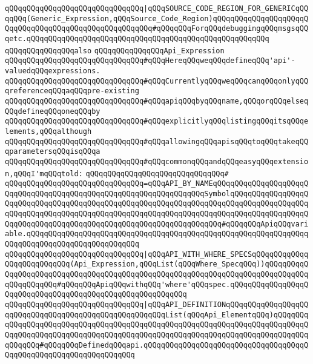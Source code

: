 \verb|qQQqqQQqqQQqqQQqqQQqqQQqqQQqqQQq|\verb#|qQQqSOURCE_CODE_REGION_FOR_GENERICqQQqqQQq(Generic_Expression,qQQqSource_Code_Region)qQQqqQQqqQQqqQQqqQQqqQQqqQQqqQQqqQQqqQQqqQQqqQQqqQQqqQQq#\verb|#qQQqqQQqForqQQqdebuggingqQQqmsgsqQQqetc.qQQqqQQqqQQqqQQqqQQqqQQqqQQqqQQqqQQqqQQqqQQqqQQqqQQqqQQq|\newline
\newline
\newline
\newline
\verb|qQQqqQQqqQQqqQQqalso|\newline
\verb|qQQqqQQqqQQqqQQqApi_Expression|\newline
\newline
\verb|qQQqqQQqqQQqqQQqqQQqqQQqqQQqqQQq#qQQqHereqQQqweqQQqdefineqQQq'api'-valuedqQQqexpressions.|\newline
\verb|qQQqqQQqqQQqqQQqqQQqqQQqqQQqqQQq#qQQqCurrentlyqQQqweqQQqcanqQQqonlyqQQqreferenceqQQqaqQQqpre-existing|\newline
\verb|qQQqqQQqqQQqqQQqqQQqqQQqqQQqqQQq#qQQqapiqQQqbyqQQqname,qQQqorqQQqelseqQQqdefineqQQqoneqQQqby|\newline
\verb|qQQqqQQqqQQqqQQqqQQqqQQqqQQqqQQq#qQQqexplicitlyqQQqlistingqQQqitsqQQqelements,qQQqalthough|\newline
\verb|qQQqqQQqqQQqqQQqqQQqqQQqqQQqqQQq#qQQqallowingqQQqapisqQQqtoqQQqtakeqQQqparametersqQQqisqQQqa|\newline
\verb|qQQqqQQqqQQqqQQqqQQqqQQqqQQqqQQq#qQQqcommonqQQqandqQQqeasyqQQqextension,qQQqI'mqQQqtold:|\newline
\verb|qQQqqQQqqQQqqQQqqQQqqQQqqQQqqQQq#|\newline
\verb|qQQqqQQqqQQqqQQqqQQqqQQqqQQqqQQq=qQQqAPI_BY_NAMEqQQqqQQqqQQqqQQqqQQqqQQqqQQqqQQqqQQqqQQqqQQqqQQqqQQqqQQqqQQqqQQqqQQqSymbolqQQqqQQqqQQqqQQqqQQqqQQqqQQqqQQqqQQqqQQqqQQqqQQqqQQqqQQqqQQqqQQqqQQqqQQqqQQqqQQqqQQqqQQqqQQqqQQqqQQqqQQqqQQqqQQqqQQqqQQqqQQqqQQqqQQqqQQqqQQqqQQqqQQqqQQqqQQqqQQqqQQqqQQqqQQqqQQqqQQqqQQqqQQqqQQqqQQqqQQqqQQqqQQq#qQQqqQQqApiqQQqvariable.qQQqqQQqqQQqqQQqqQQqqQQqqQQqqQQqqQQqqQQqqQQqqQQqqQQqqQQqqQQqqQQqqQQqqQQqqQQqqQQqqQQqqQQqqQQqqQQq|\newline
\verb|qQQqqQQqqQQqqQQqqQQqqQQqqQQqqQQq|\verb#|qQQqAPI_WITH_WHERE_SPECSqQQqqQQqqQQqqQQqqQQqqQQqqQQq(Api_Expression,qQQqList(qQQqWhere_SpecqQQq))qQQqqQQqqQQqqQQqqQQqqQQqqQQqqQQqqQQqqQQqqQQqqQQqqQQqqQQqqQQqqQQqqQQqqQQqqQQqqQQqqQQqqQQqqQQq#\verb|#qQQqqQQqApiqQQqwithqQQq'where'qQQqspec.qQQqqQQqqQQqqQQqqQQqqQQqqQQqqQQqqQQqqQQqqQQqqQQqqQQqqQQqqQQq|\newline
\verb|qQQqqQQqqQQqqQQqqQQqqQQqqQQqqQQq|\verb#|qQQqAPI_DEFINITIONqQQqqQQqqQQqqQQqqQQqqQQqqQQqqQQqqQQqqQQqqQQqqQQqqQQqqQQqList(qQQqApi_ElementqQQq)qQQqqQQqqQQqqQQqqQQqqQQqqQQqqQQqqQQqqQQqqQQqqQQqqQQqqQQqqQQqqQQqqQQqqQQqqQQqqQQqqQQqqQQqqQQqqQQqqQQqqQQqqQQqqQQqqQQqqQQqqQQqqQQqqQQqqQQqqQQqqQQqqQQqqQQqqQQq#\verb|#qQQqqQQqDefinedqQQqapi.qQQqqQQqqQQqqQQqqQQqqQQqqQQqqQQqqQQqqQQqqQQqqQQqqQQqqQQqqQQqqQQqqQQq|\newline
